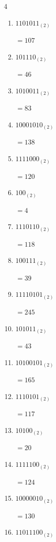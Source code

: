 \begin{multicols}{4}
\begin{enumerate}
        $=208$

  \item $1101011_{(2)}$

        $=107$

  \item $101110_{(2)}$

        $=46$

  \item $1010011_{(2)}$

        $=83$

  \item $10001010_{(2)}$

        $=138$

  \item $1111000_{(2)}$

        $=120$

  \item $100_{(2)}$

        $=4$

  \item $1110110_{(2)}$

        $=118$

  \item $100111_{(2)}$

        $=39$

  \item $11110101_{(2)}$

        $=245$

\columnbreak %

\resetques

  \item $101011_{(2)}$

        $=43$

  \item $10100101_{(2)}$

        $=165$

  \item $1110101_{(2)}$

        $=117$

  \item $10100_{(2)}$

        $=20$

  \item $1111100_{(2)}$

        $=124$

  \item $10000010_{(2)}$

        $=130$

  \item $11011100_{(2)}$


\end{enumerate}
\end{multicols}
